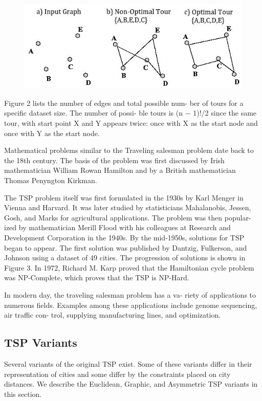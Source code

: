 \documentclass[10pt,twocolumn,letterpaper]{article}
\begin{document}
\begin{figure}
\centering
\includegraphics[width=0.7\linewidth]{egtsp}
\caption{}
\label{fig:egtsp}
\end{figure}

Figure 2 lists the number of edges and total possible num-
ber of tours for a specific dataset size. The number of possi-
ble tours is (n − 1)!/2 since the same tour, with start point
X and Y appears twice: once with X as the start node and
once with Y as the start node.

Mathematical problems similar to the Traveling salesman
problem date back to the 18th century. The basis of the
problem was first discussed by Irish mathematician William
Rowan Hamilton and by a British mathematician Thomas
Penyngton Kirkman.

The TSP problem itself was first formulated in the 1930s
by Karl Menger in Vienna and Harvard. It was later studied
by statisticians Mahalanobis, Jessen, Gosh, and Marks for
agricultural applications. The problem was then popular-
ized by mathematician Merill Flood with his colleagues at
Research and Development Corporation in the 1940s. By
the mid-1950s, solutions for TSP began to appear. The first
solution was published by Dantzig, Fulkerson, and Johnson
using a dataset of 49 cities. The progression of solutions is
shown in Figure 3. In 1972, Richard M. Karp proved that
the Hamiltonian cycle problem was NP-Complete, which
proves that the TSP is NP-Hard.

In modern day, the traveling salesman problem has a va-
riety of applications to numerous fields. Examples among
these applications include genome sequencing, air traffic con-
trol, supplying manufacturing lines, and optimization.

\subsection{TSP Variants}
Several variants of the original TSP exist. Some of these
variants differ in their representation of cities and some differ
by the constraints placed on city distances. We describe the
Euclidean, Graphic, and Asymmetric TSP variants in this
section.
\end{document}
